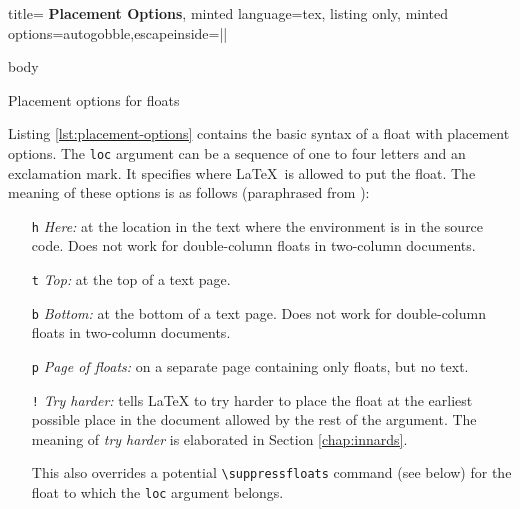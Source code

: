 \documentclass[article,a4paper,oneside,10pt]{memoir}
\newcommand\code[1]{\texttt{#1}}
\begin{document}
\begin{listing}
    \begin{tcblisting}{%
            title={\bfseries\sffamily%
                Placement Options},
            minted language=tex,
            listing only,
            minted options={autogobble,escapeinside=||}}
            \begin{float type}[|\textcolor{solarized-red}{loc}|] body \end{float type}
    \end{tcblisting}
    \caption{Placement options for floats}
    \label{lst:placement-options}
\end{listing}

Listing \ref{lst:placement-options} contains the basic  syntax of a float with
placement options. The  \code{loc} argument can be  a sequence of one  to four
letters and an exclamation mark. It specifies  where \LaTeX\ is allowed to put
the  float. The meaning  of  these  options is  as  follows (paraphrased  from
\cite{lamport}):

\begin{itemize}
    \item  [\code{\color{solarized-red}h}] \emph{Here:}  at  the  location in  the  text where  the
        environment is  in the  source code. Does  not work  for double-column
        floats in two-column documents.

    \item [\code{\color{solarized-red}t}] \emph{Top:} at the top of a text page.

    \item [\code{\color{solarized-red}b}]  \emph{Bottom:} at  the bottom of  a text  page. Does not
        work for double-column floats in two-column documents.

    \item [\code{\color{solarized-red}p}] \emph{Page of floats:} on a separate page containing only
        floats, but no text.

    \item [\code{\color{solarized-red}!}] \emph{Try harder:} tells  \LaTeX{} to try harder to place
        the float  at the earliest possible  place in the document  allowed by
        the  rest  of  the  argument. The  meaning  of  \emph{try  harder}  is
        elaborated in Section \ref{chap:innards}.

        This also  overrides a  potential \verb|\suppressfloats|  command (see
        below) for the float to which the \code{loc} argument belongs.
\end{itemize}
\end{document}
